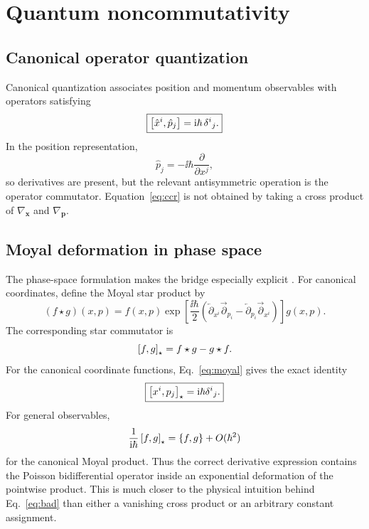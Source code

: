 \section{Quantum noncommutativity}

\subsection{Canonical operator quantization}

Canonical quantization associates position and momentum observables with operators satisfying
\begin{equation}
\boxed{
\left[\hat x^i,\hat p_j\right]
=
\mathrm{i}\hbar\,\delta^i{}_j.
}
\label{eq:ccr}
\end{equation}
In the position representation,
\begin{equation}
\hat p_j=-\ii\hbar\frac{\partial}{\partial x^j},
\end{equation}
so derivatives are present, but the relevant antisymmetric operation is the operator commutator. Equation~\eqref{eq:ccr} is not obtained by taking a cross product of \(\nabla_{\bm{x}}\) and \(\nabla_{\bm{p}}\).

\subsection{Moyal deformation in phase space}

The phase-space formulation makes the bridge especially explicit \cite{Groenewold,Moyal,Zachos}. For canonical coordinates, define the Moyal star product by
\begin{equation}
\boxed{
(f\star g)(x,p)
=
f(x,p)
\exp\!\left[
\frac{\ii\hbar}{2}
\left(
\overleftarrow{\partial}_{x^i}
\overrightarrow{\partial}_{p_i}
-
\overleftarrow{\partial}_{p_i}
\overrightarrow{\partial}_{x^i}
\right)
\right]
g(x,p).
}
\label{eq:moyal}
\end{equation}
The corresponding star commutator is
\begin{equation}
\left[f,g\right]_{\star}
=f\star g-g\star f.
\end{equation}
For the canonical coordinate functions, Eq.~\eqref{eq:moyal} gives the exact identity
\begin{equation}
\boxed{
\left[x^i,p_j\right]_{\star}
=
\mathrm{i}\hbar\delta^i{}_j.
}
\label{eq:starccr}
\end{equation}
For general observables,
\begin{equation}
\frac{1}{\mathrm{i}\hbar}\left[f,g\right]_{\star}
=
\left\{f,g\right\}+O(\hbar^2)
\label{eq:classical-limit}
\end{equation}
for the canonical Moyal product. Thus the correct derivative expression contains the Poisson bidifferential operator inside an exponential deformation of the pointwise product. This is much closer to the physical intuition behind Eq.~\eqref{eq:bad} than either a vanishing cross product or an arbitrary constant assignment.

